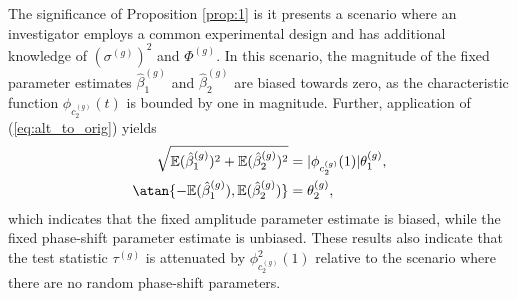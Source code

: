 The significance of Proposition \ref{prop:1} is it presents a scenario where an investigator employs a common experimental design and has additional knowledge of $(\sigma^{(g)})^2$ and $\Phi^{(g)}$. In this scenario, the magnitude of the fixed parameter estimates $\hat{\beta}_1^{(g)}$ and $\hat{\beta}_2^{(g)}$ are biased towards zero, as the characteristic function $\phi_{c_2^{(g)}}(t)$ is bounded by one in magnitude. Further, application of (\ref{eq:alt_to_orig}) yields
\begin{align*}
    \sqrt{\mathbb{E}(\hat{\beta}^{(g)}_1)^2 + \mathbb{E}(\hat{\beta}^{(g)}_2)^2}  &= |\phi_{c^{(g)}_2}(1)|\theta^{(g)}_1, \\
    \atan\{-\mathbb{E}(\hat{\beta}^{(g)}_1), \mathbb{E}(\hat{\beta}^{(g)}_2)\}  &= \theta^{(g)}_2,
\end{align*}
which indicates that the fixed amplitude parameter estimate is biased, while the fixed phase-shift parameter estimate is unbiased. These results also indicate that the test statistic $\tau^{(g)}$ is attenuated by $\phi^2_{c^{(g)}_2}(1)$ relative to the scenario where there are no random phase-shift parameters.


